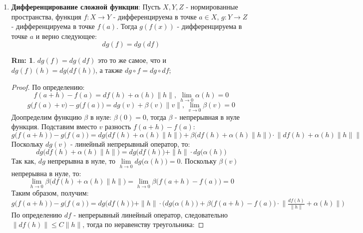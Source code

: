 \documentclass[12pt]{article}
\theoremstyle{definition}
\newtheorem{rem}{Rm:}
\begin{document}
\begin{enumerate}[label ={(\arabic*)}]
\begin{proof}
		По определению $df$ - непрерывный линейный оператор, следовательно $\|df(h)\| \leq C \|h\|$, тогда получим:
		$$
			\Big\|\big(g(a+h) - g(a)\big){\cdot}\tfrac{df(h)}{\|h\|}\Big\| = \Big|\big(g(a+h) - g(a)\big)\Big|{\cdot}\dfrac{1}{\|h\|}{\cdot}\|df(h)\| \leq C\Big|\big(g(a+h) - g(a)\big)\Big| \to 0
		$$
		То есть получили что-то стремящееся к нуля, умноженное на что-то ограниченное. Таким  образом остаточная часть выражения стремится к нулю при $h \to 0$:
		$$
			\lim\limits_{h\to 0}\Big(g(a)\gamma_1(h) + \big(g(a+h) - g(a)\big)\big(\tfrac{df(h)}{\|h\|} + \gamma_1(h)\big) + f(a) \gamma_2(h) \Big) = 0
		$$
	\end{proof}
	\newpage
	\item \textbf{Дифференцирование сложной функции}: Пусть $X, Y, Z$ - нормированные пространства, функция $f \colon X \to Y$ - дифференцируема в точке $a \in X$, $g\colon Y \to Z$ - дифференцируема в точке $f(a)$. Тогда $g(f(x))$ - дифференцируема в точке $a$ и верно следующее:
	$$
		dg(f) = dg(df)
	$$
	\begin{rem}
		$dg(f) = dg(df)$ это то же самое, что и $dg(f)(h) = dg\big(df(h)\big)$, а также $dg \circ f = dg \circ df$;
	\end{rem}
	\begin{proof}
		По определению:
		$$
			f(a+h) - f(a) = df(h) + \alpha(h)\|h\|,\, \lim\limits_{h \to 0} \alpha(h) = 0
		$$
		$$
			g\big(f(a)+v\big) - g\big(f(a)\big) = dg(v) + \beta(v)\|v\|,\, \lim\limits_{v \to 0} \beta(v) = 0
		$$
		Доопределим функцию $\beta$ в нуле: $\beta(0) = 0$, тогда $\beta$ - непрерывная в нуле функция. Подставим вместо $v$ разность $f(a+h) - f(a)$:
		$$
			g\big(f(a+h)\big) - g\big(f(a)\big) = dg\big(df(h) + \alpha(h)\|h\| \big) + \beta\big(df(h) + \alpha(h)\|h\| \big){\cdot}\big\|df(h) + \alpha(h)\|h\| \big\|
		$$
		Поскольку $dg(v)$ - линейный непрерывный оператор, то:
		$$
			dg\big(df(h) + \alpha(h)\|h\| \big) = dg\big(df(h)\big) + \|h\|{\cdot}dg\big(\alpha(h)\big)
		$$ 
		Так как, $dg$ непрерывна в нуле, то $\lim\limits_{h\to 0} dg\big(\alpha(h)\big) = 0$. Поскольку $\beta(v)$ непрерывна в нуле, то:
		$$
				\lim\limits_{h \to 0} \beta\big(df(h) + \alpha(h)\|h\| \big) = \lim\limits_{h \to 0} \beta\big(f(a+h) - f(a)\big) = 0
		$$
		Таким образом, получим:
		$$
			g\big(f(a+h)\big) - g\big(f(a)\big) =  dg\big(df(h)\big) + \|h\|{\cdot}\Big( dg\big(\alpha(h) \big) + \beta\big(f(a+h) - f(a)\big){\cdot}\Big\|\tfrac{df(h)}{\|h\|} + \alpha(h)\Big\| \Big) 
		$$
		По определению $df$ - непрерывный линейный оператор, следовательно $\|df(h)\| \leq C \|h\|$, тогда по неравенству треугольника:

\end{proof}
\end{enumerate}
\end{document}
